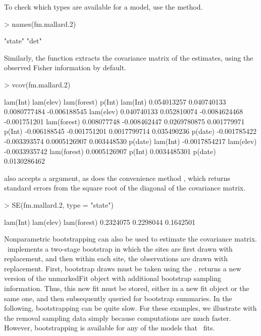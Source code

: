 \documentclass[article,shortnames]{jss}
\newcommand{\um}{\pkg{unmarked}}
\begin{document}
To check which types are available for a model, use the  method.

\begin{Schunk}
\begin{Sinput}
> names(fm.mallard.2)
\end{Sinput}
\begin{Soutput}
[1] "state" "det"  
\end{Soutput}
\end{Schunk}

Similarly, the  function extracts the covariance matrix of
the estimates, using the observed Fisher information by default.

\begin{Schunk}
\begin{Sinput}
> vcov(fm.mallard.2)
\end{Sinput}
\begin{Soutput}
                lam(Int)    lam(elev)   lam(forest)       p(Int)
lam(Int)     0.054013257  0.040740133  0.0080777484 -0.006188545
lam(elev)    0.040740133  0.052810074 -0.0084624468 -0.001751201
lam(forest)  0.008077748 -0.008462447  0.0269780875  0.001779971
p(Int)      -0.006188545 -0.001751201  0.0017799714  0.035490236
p(date)     -0.001785422 -0.003393574  0.0005126907  0.003448530
                  p(date)
lam(Int)    -0.0017854217
lam(elev)   -0.0033935742
lam(forest)  0.0005126907
p(Int)       0.0034485301
p(date)      0.0130286462
\end{Soutput}
\end{Schunk}

 also accepts a  argument, as does the convenience method 
, which returns standard errors from the square root of the diagonal 
of the covariance matrix.

\begin{Schunk}
\begin{Sinput}
> SE(fm.mallard.2, type = "state")
\end{Sinput}
\begin{Soutput}
   lam(Int)   lam(elev) lam(forest) 
  0.2324075   0.2298044   0.1642501 
\end{Soutput}
\end{Schunk}

Nonparametric bootstrapping can also be used to estimate the
covariance matrix. \um\ implements a two-stage bootstrap in which the
 sites are first drawn with replacement, and then within each site, the
observations are drawn with replacement.  First, bootstrap draws must
be taken using the .   returns a new
version of the unmarkedFit object with additional bootstrap sampling
information.  Thus, this new fit must be stored, either in a new fit
object or the same one, and then subsequently queried for bootstrap
summaries.  In the following, bootstrapping can be quite slow.  For
these examples, we illustrate with the removal sampling data simply
because computations are much faster.  However, bootstrapping is
available for any of the models that \um\ fits.
\end{document}
